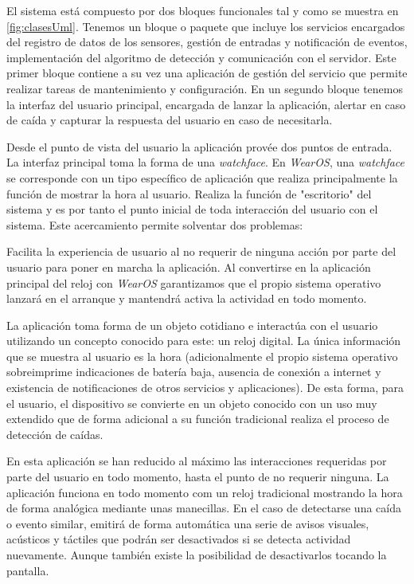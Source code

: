 \documentclass[../tfm.tex]{subfiles}
\begin{document}
El sistema está compuesto por dos bloques funcionales tal y como se muestra en \ref{fig:clasesUml}. Tenemos un bloque o paquete que incluye los servicios encargados del registro de datos de los sensores, gestión de entradas y notificación de eventos, implementación del algoritmo de detección y comunicación con el servidor. Este primer bloque contiene a su vez una aplicación de gestión del servicio que permite realizar tareas de mantenimiento y configuración. En un segundo bloque tenemos la interfaz del usuario principal, encargada de lanzar la aplicación, alertar en caso de caída y capturar la respuesta del usuario en caso de necesitarla.


Desde el punto de vista del usuario la aplicación provée dos puntos de entrada. La interfaz principal toma la forma de una \textit{watchface}. En \textit{WearOS}, una \textit{watchface} se corresponde con un tipo específico de aplicación que realiza principalmente la función de mostrar la hora al usuario. Realiza la función de "escritorio" del sistema y es por tanto el punto inicial de toda interacción del usuario con el sistema. Este acercamiento permite solventar dos problemas:

Facilita la experiencia de usuario al no requerir de ninguna acción por parte del usuario para poner en marcha la aplicación. Al convertirse en la aplicación principal del reloj con  \textit{WearOS} garantizamos que el propio sistema operativo lanzará en el arranque y mantendrá activa la actividad en todo momento.

La aplicación toma forma de un objeto cotidiano e interactúa con el usuario utilizando un concepto conocido para este: un reloj digital. La única información que se muestra al usuario es la hora (adicionalmente el propio sistema operativo sobreimprime indicaciones de batería baja, ausencia de conexión a internet y existencia de notificaciones de otros servicios y aplicaciones). De esta forma, para el usuario, el dispositivo se convierte en un objeto conocido con un uso muy extendido que de forma adicional a su función tradicional realiza el proceso de detección de caídas.

En esta aplicación se han reducido al máximo las interacciones requeridas por parte del usuario en todo momento, hasta el punto de no requerir ninguna. La aplicación funciona en todo momento com un reloj tradicional mostrando la hora de forma analógica mediante unas manecillas. En el caso de detectarse una caída o evento similar, emitirá de forma automática una serie de avisos visuales, acústicos y táctiles que podrán ser desactivados si se detecta actividad nuevamente. Aunque también existe la posibilidad de desactivarlos tocando la pantalla.
\end{document}

